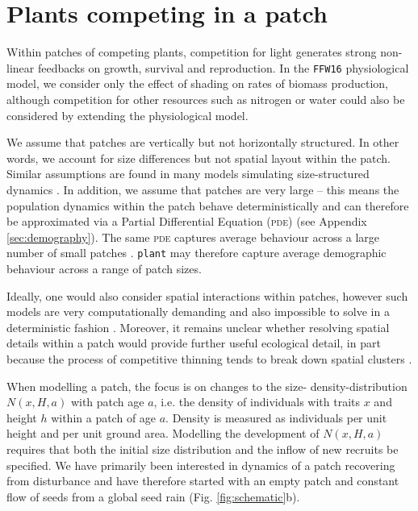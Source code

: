 \documentclass[a4paper,11pt]{article}
\newcommand{\plant}{\texttt{plant}}
\begin{document}
\section{Plants competing in a patch}

Within patches of competing plants, competition for light generates
strong non-linear feedbacks on growth, survival and reproduction. In the
\texttt{FFW16} physiological model, we consider only the effect of
shading on rates of biomass production, although competition for other
resources such as nitrogen or water could also be considered by extending the 
physiological model.

We assume that patches are vertically but not horizontally
structured. In other words, we account for size differences but not spatial 
layout within the patch. Similar assumptions are found in many models
simulating size-structured dynamics
\citep{Shugart-1980,Kohyama-1993, Huston-1987, Moorcroft-2001, Smith-2014}. In addition, 
we assume that patches are very large -- this means the population dynamics 
within the patch behave deterministically \citep{Deroos-1997} and can therefore 
be approximated via a Partial Differential Equation (\textsc{pde}) (see Appendix
\ref{sec:demography}). The same \textsc{pde} captures average behaviour
across a large number of small patches \citep{Moorcroft-2001}. {\plant} may 
therefore capture average demographic behaviour across a range of patch sizes.

Ideally, one would also consider spatial interactions within patches,
however such models are very computationally demanding and also
impossible to solve in a deterministic fashion \citep{Shugart-1980, 
Pacala-1996}. Moreover, it remains unclear whether resolving spatial details within a
patch would provide further useful ecological detail, in part because the
process of competitive thinning tends to break down spatial clusters
\citep{Strigul-2008}.

When modelling a patch, the focus is on changes to the size-
density-distribution \(N(x, H, a)\) with patch age \(a\), i.e. the density of
individuals with traits \(x\) and height \(h\) within a patch of age \(a\).
Density is measured as individuals per unit height and per unit ground area.
Modelling the development of  \(N(x, H,a)\) requires that both the initial size
distribution and the inflow of new recruits be specified. We have primarily
been interested in dynamics of a patch recovering from disturbance and have
therefore started with an empty patch and constant flow of seeds from a global
seed rain (Fig. \ref{fig:schematic}b).
\end{document}
